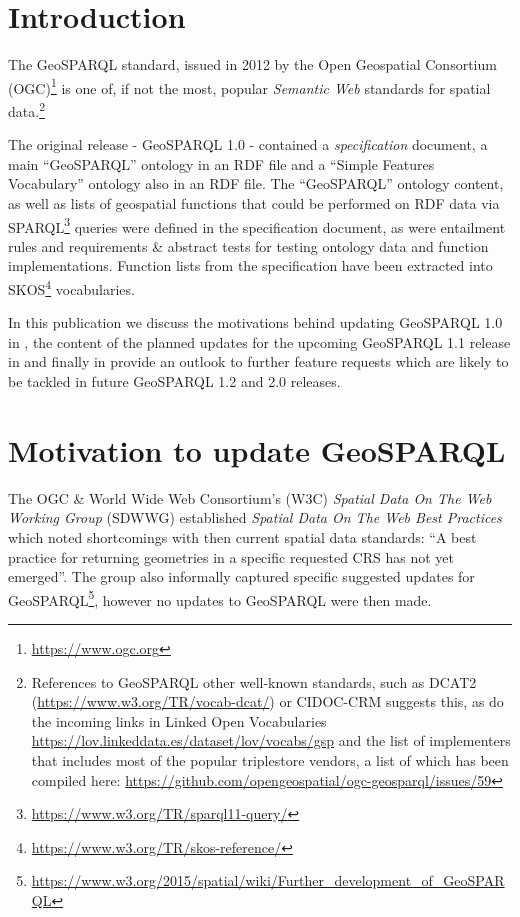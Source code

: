 \documentclass[runningheads]{llncs}
\begin{document}
\section{Introduction}\label{sec:introduction}
The GeoSPARQL standard, issued in 2012 by the Open Geospatial Consortium (OGC)\footnote{\url{https://www.ogc.org}} 
is one of, if not the most, popular \textit{Semantic Web} standards for spatial data.\footnote{References to GeoSPARQL other well-known standards, 
such as DCAT2 (\url{https://www.w3.org/TR/vocab-dcat/}) or CIDOC-CRM \cite{doerr2013crmgeo} suggests this, as do the incoming links in Linked Open Vocabularies \url{https://lov.linkeddata.es/dataset/lov/vocabs/gsp} and the list of implementers that includes most of the popular triplestore vendors, a list of which has been compiled here: \url{https://github.com/opengeospatial/ogc-geosparql/issues/59}}

The original release - GeoSPARQL 1.0 - contained a \textit{specification} document,
a main ``GeoSPARQL'' ontology in an RDF file and a ``Simple Features Vocabulary'' ontology also in an RDF file. The 
``GeoSPARQL'' ontology content, as well as lists of geospatial functions that could be performed on RDF data via 
SPARQL\footnote{\url{https://www.w3.org/TR/sparql11-query/}} queries were defined in the specification document, as
were entailment rules and requirements \& abstract tests for testing ontology data and function implementations. 
Function lists from the specification have been extracted into SKOS\footnote{\url{https://www.w3.org/TR/skos-reference/}}
vocabularies.

In this publication we discuss the motivations behind updating GeoSPARQL 1.0 in , the content of the planned updates for the upcoming GeoSPARQL 1.1 release in  and finally in  provide an outlook to further feature requests which are likely to be tackled in future GeoSPARQL 1.2 and 2.0 releases.


\section{Motivation to update GeoSPARQL}\label{sec:motivation}
The OGC \& World Wide Web Consortium's (W3C) \textit{Spatial Data On The Web Working Group}
(SDWWG) established \textit{Spatial Data On The Web Best Practices}~\cite{van_den_brink_best_2018} which noted 
shortcomings with then current spatial data standards: ``A best practice for returning geometries in a 
specific requested CRS has not yet emerged''. The group also informally captured specific suggested updates for 
GeoSPARQL\footnote{\url{https://www.w3.org/2015/spatial/wiki/Further_development_of_GeoSPARQL}}, however no updates 
to GeoSPARQL were then made.
\end{document}
